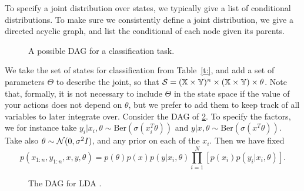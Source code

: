 To specify a joint distribution over states, we typically give a list of conditional distributions. 
To make sure we consistently define a joint distribution, we give a directed acyclic graph, and list the conditional of each node given its parents.

\begin{figure}[!ht]
    \centering
  \caption{A possible DAG for a classification task.}
  \label{f:classification_dag}
\end{figure}

\begin{example}
    \label{ex:classification}
    We take the set of states for classification from Table~\ref{t:}, and add a set of parameters $\Theta$ to describe the joint, so that $\mathcal{S} = (\mathbb{X}\times\mathbb{Y})^n \times (\mathbb{X}\times\mathbb{Y}) \times \theta$.
    Note that, formally, it is not necessary to include $\Theta$ in the state space if the value of your actions does not depend on $\theta$, but we prefer to add them to keep track of all variables to later integrate over.
    Consider the DAG of \cref{f:classification_dag}.
    To specify the factors, we for instance take $y_i\vert x_i, \theta \sim \mathrm{Ber}(\sigma(x_i^T\theta))$ and $y\vert x, \theta \sim \mathrm{Ber}(\sigma(x^T\theta))$. Take also $\theta\sim \mathcal{N}(0,\sigma^2 I)$, and any prior on each of the $x_i$.
    Then we have fixed
    $$
        p(x_{1:n}, y_{1:n}, x, y, \theta) = p(\theta) p(x) p(y\vert x_i, \theta) \prod_{i=1}^N \left[p(x_i) p(y_i\vert x_i, \theta)\right].
    $$
\end{example}

\begin{figure}[!ht]
    \centering
  \caption{The DAG for LDA \citep{}.}
  \label{f:classification_dag}
\end{figure}

